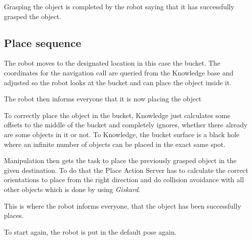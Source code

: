\documentclass[main.tex]{subfiles}
\begin{document}
	\begin{nlp}
	Grasping the object is completed by the robot saying that it has successfully grasped the object.
	\end{nlp}
    
	\subsection{Place sequence}
	\begin{navigation}
	The robot moves to the designated location in this case the bucket.
	The coordinates for the navigation call are queried from the Knowledge base and adjusted so the robot looks at the bucket and can place the object inside it. 
	\end{navigation}
	
	\begin{nlp}
	The robot then informs everyone that it is now placing the object
	\end{nlp}

	\begin{knowledge}
	To correctly place the object in the bucket, Knowledge just calculates some offsets to the middle of the bucket and completely ignores, whether there already are some objects in it or not. To Knowledge, the bucket surface is a black hole where an infinite number of objects can be placed in the exact same spot.
	\end{knowledge}

	\begin{manipulation}
	 Manipulation then gets the task to place the previously grasped object in the given destination. To do that the Place Action Server has to calculate the correct orientations to place from the right direction and do collision avoidance with all other objects which is done by using \textit{Giskard}.
	 \end{manipulation}
	 
	\begin{nlp}
	This is where the robot informs everyone, that the object has been successfully places.
	\end{nlp}

	\begin{manipulation}
	To start again, the robot is put in the default pose again.
	\end{manipulation}
	
\end{document}
